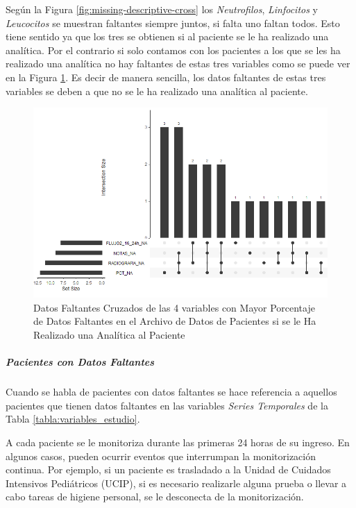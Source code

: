Según la Figura \ref{fig:missing-descriptive-cross} los \textit{Neutrofilos}, \textit{Linfocitos} y \textit{Leucocitos} se muestran faltantes siempre juntos, si falta uno faltan todos. Esto tiene sentido ya que los tres se obtienen si al paciente se le ha realizado una analítica. Por el contrario si solo contamos con los pacientes a los que se les ha realizado una analítica no hay faltantes de estas tres variables como se puede ver en la Figura \ref{fig:missing-descriptive-cross-analitica}. Es decir de manera sencilla, los datos faltantes de estas tres variables se deben a que no se le ha realizado una analítica al paciente.

\begin{figure}[H]
    \centering
    \includegraphics[scale = 0.70]{./img/missig-data-descriptive-cross-anal.png}
    \caption{Datos Faltantes Cruzados de las 4 variables con Mayor Porcentaje de Datos Faltantes en el Archivo de Datos de Pacientes si se le Ha Realizado una Analítica al Paciente}
    \label{fig:missing-descriptive-cross-analitica}
\end{figure}
\newpage


\subparagraph*{Pacientes con Datos Faltantes} 

Cuando se habla de pacientes con datos faltantes se hace referencia a aquellos pacientes que tienen datos faltantes en las variables \textit{Series Temporales} de la Tabla \ref{tabla:variables_estudio}. 

A cada paciente se le monitoriza durante las primeras 24 horas de su ingreso. En algunos casos, pueden ocurrir eventos que interrumpan la monitorización continua. Por ejemplo, si un paciente es trasladado a la Unidad de Cuidados Intensivos Pediátricos (UCIP), si es necesario realizarle alguna prueba o llevar a cabo tareas de higiene personal, se le desconecta de la monitorización. 

